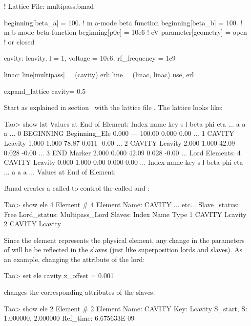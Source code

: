 \documentclass{hitec}     %
\begin{document}
{\begin{code}
! Lattice File: multipass.bmad

beginning[beta_a] = 100.   ! m  a-mode beta function
beginning[beta_b] = 100.   ! m  b-mode beta function
beginning[p0c] = 10e6   ! eV   
parameter[geometry] = open      ! or closed

cavity: lcavity, l = 1, voltage = 10e6, rf_frequency = 1e9

linac: line[multipass] = (cavity)
erl: line = (linac, linac) 
use, erl

expand_lattice                
cavity = 0.5
\end{code}

Start \tao as explained in section~ with the lattice file
. The lattice looks like:

\begin{code}
Tao> show lat
      Values at End of Element:
 Index  name       key                   s       l    beta     phi    eta ...
                                                         a       a      a ...
     0  BEGINNING  Beginning_Ele     0.000     ---  100.00   0.000   0.00 ...
     1  CAVITY\1   Lcavity           1.000   1.000   78.87   0.011  -0.00 ...
     2  CAVITY\2   Lcavity           2.000   1.000   42.09   0.028  -0.00 ...
     3  END        Marker            2.000   0.000   42.09   0.028  -0.00 ...
Lord Elements:
     4  CAVITY     Lcavity           0.000   1.000    0.00   0.000   0.00 ...
 Index  name       key                   s       l    beta     phi    eta ...
                                                         a       a      a ...
  Values at End of Element:
\end{code}

Bmad creates a  called  to control the  called
 and :
\begin{code}
Tao> show ele 4
 Element #                4
 Element Name: CAVITY
... etc...
Slave_status: Free
Lord_status:  Multipass_Lord
Slaves:
   Index   Name        Type
       1   CAVITY\1    Lcavity
       2   CAVITY\2    Lcavity
\end{code}

Since the  element represents the physical element, any change in the parameters of 
will be be reflected in the slaves (just like superposition lords and slaves). As an example, changing
the attribute of the lord:
\begin{code}
Tao> set ele cavity x_offset = 0.001
\end{code}
changes the corresponding attributes of the slaves:
\begin{code}
Tao> show ele 2
 Element #                2
 Element Name: CAVITY\2
 Key: Lcavity
 S_start, S:    1.000000,    2.000000
 Ref_time:  6.675633E-09


\end{code}}
\end{document}
